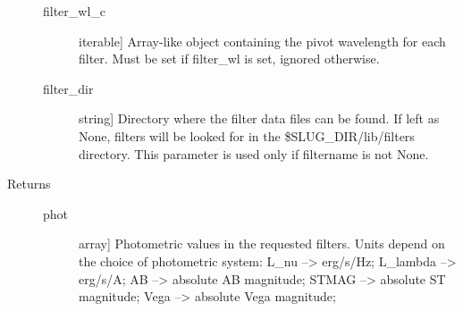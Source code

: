 \documentclass[letterpaper,10pt,english]{sphinxmanual}
\begin{document}
\begin{fulllineitems}
\begin{description}
\begin{description}
\item[{filter\_wl\_c}] \leavevmode{[}iterable{]}
Array-like object containing the pivot wavelength for each
filter. Must be set if filter\_wl is set, ignored otherwise.

\item[{filter\_dir}] \leavevmode{[}string{]}
Directory where the filter data files can be found. If left as
None, filters will be looked for in the \$SLUG\_DIR/lib/filters
directory. This parameter is used only if filtername is not
None.

\end{description}

\item[{Returns}] \leavevmode\begin{description}
\item[{phot}] \leavevmode{[}array{]}
Photometric values in the requested filters. Units depend on
the choice of photometric system:
L\_nu --\textgreater{} erg/s/Hz;
L\_lambda --\textgreater{} erg/s/A;
AB --\textgreater{} absolute AB magnitude;
STMAG --\textgreater{} absolute ST magnitude;
Vega --\textgreater{} absolute Vega magnitude;

\end{description}

\end{description}

\end{fulllineitems}

\end{document}
